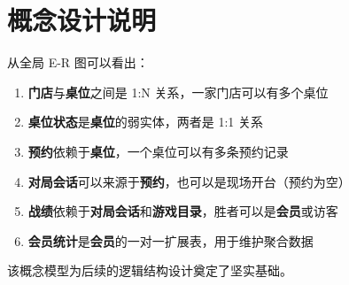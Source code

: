 \section{概念设计说明}

从全局 E-R 图可以看出：

\begin{enumerate}
  \item \textbf{门店}与\textbf{桌位}之间是 1:N 关系，一家门店可以有多个桌位
  \item \textbf{桌位状态}是\textbf{桌位}的弱实体，两者是 1:1 关系
  \item \textbf{预约}依赖于\textbf{桌位}，一个桌位可以有多条预约记录
  \item \textbf{对局会话}可以来源于\textbf{预约}，也可以是现场开台（预约为空）
  \item \textbf{战绩}依赖于\textbf{对局会话}和\textbf{游戏目录}，胜者可以是\textbf{会员}或访客
  \item \textbf{会员统计}是\textbf{会员}的一对一扩展表，用于维护聚合数据
\end{enumerate}

该概念模型为后续的逻辑结构设计奠定了坚实基础。
